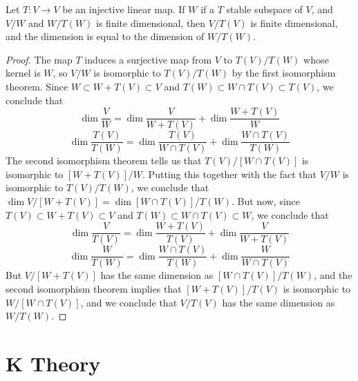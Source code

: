 \begin{theorem}
    Let $T:V \to V$ be an injective linear map. If $W$ if a $T$ stable subspace of $V$, and $V/W$ and $W/T(W)$ is finite dimensional, then $V/T(V)$ is finite dimensional, and the dimension is equal to the dimension of $W/T(W)$.
\end{theorem}
\begin{proof}
    The map $T$ induces a surjective map from $V$ to $T(V)/T(W)$ whose kernel is $W$, so $V/W$ is isomorphic to $T(V)/T(W)$ by the first isomorphism theorem. Since $W \subset W + T(V) \subset V$ and $T(W) \subset W \cap T(V) \subset T(V)$, we conclude that
    \[ \dim \frac{V}{W} = \dim \frac{V}{W + T(V)} + \dim \frac{W + T(V)}{W} \]
    \[ \dim \frac{T(V)}{T(W)} = \dim \frac{T(V)}{W \cap T(V)} + \dim \frac{W \cap T(V)}{T(W)} \]
    The second isomorphism theorem tells us that $T(V)/[W \cap T(V)]$ is isomorphic to $[W + T(V)]/W$. Putting this together with the fact that $V/W$ is isomorphic to $T(V)/T(W)$, we conclude that $\dim V/[W + T(V)] = \dim [W \cap T(V)]/T(W)$. But now, since $T(V) \subset W + T(V) \subset V$ and $T(W) \subset W \cap T(V) \subset W$, we conclude that
    \[ \dim \frac{V}{T(V)} = \dim \frac{W + T(V)}{T(V)} + \dim \frac{V}{W + T(V)} \]
    \[ \dim \frac{W}{T(W)} = \dim \frac{W \cap T(V)}{T(W)} + \dim \frac{W}{W \cap T(V)} \]
    But $V/[W + T(V)]$ has the same dimension as $[W \cap T(V)]/T(W)$, and the second isomorphism theorem implies that $[W + T(V)]/T(V)$ is isomorphic to $W/[W \cap T(V)]$, and we conclude that $V/T(V)$ has the same dimension as $W/T(W)$.
\end{proof}

\chapter{K Theory}


